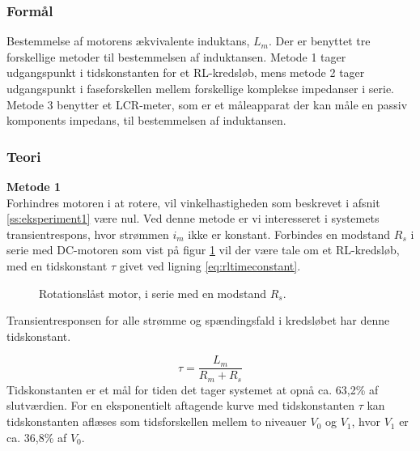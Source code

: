 \subsubsection{Formål}
Bestemmelse af motorens ækvivalente induktans, \(L_m\).
Der er benyttet tre forskellige metoder til bestemmelsen af induktansen.
Metode 1 tager udgangspunkt i tidskonstanten for et RL-kredsløb,
mens metode 2 tager udgangspunkt i faseforskellen mellem forskellige komplekse impedanser i serie.
Metode 3 benytter et LCR-meter, som er et måleapparat der kan måle en passiv komponents impedans, til bestemmelsen af induktansen.
\subsubsection{Teori}
\textbf{Metode 1}\\
Forhindres motoren i at rotere, vil vinkelhastigheden som beskrevet i afsnit \ref{ss:eksperiment1} være nul.
Ved denne metode er vi interesseret i systemets transientrespons, hvor strømmen \(i_m\) ikke er konstant.
Forbindes en modstand \(R_s\) i serie med DC-motoren som vist på figur \ref{fig:eksperiment2metode1} vil der være tale om et RL-kredsløb, med en tidskonstant \(\tau\) givet ved ligning \ref{eq:rltimeconstant}.

\begin{figure}[!th]
\centering
\begin{circuitikz}
  
\end{circuitikz}
\caption[Rotationslåst motor med $R_s$]{Rotationslåst motor, i serie med en modstand \(R_s\).}
\label{fig:eksperiment2metode1}
\end{figure}


Transientresponsen for alle strømme og spændingsfald i kredsløbet har denne tidskonstant.

\begin{equation}
	\tau=\frac{L_m}{R_m+R_s}
	\label{eq:rltimeconstant} 
 \end{equation}
Tidskonstanten er et mål for tiden det tager systemet at opnå ca. 63,2\% af slutværdien. For en eksponentielt aftagende kurve med tidskonstanten \(\tau\) kan tidskonstanten aflæses som
tidsforskellen mellem to niveauer \(V_0\) og \(V_1\), hvor \(V_1\) er ca. 36,8\% af \(V_0\).

